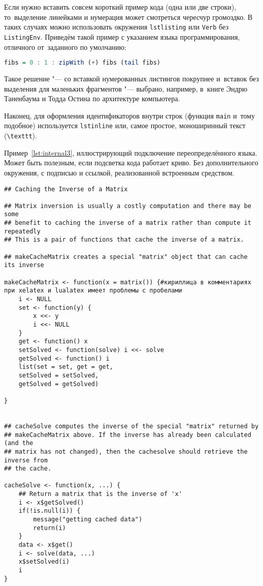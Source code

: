 Если нужно вставить совсем короткий пример кода (одна или две строки),
то~выделение  линейками и нумерация может смотреться чересчур громоздко.
В таких случаях можно использовать окружения \texttt{lstlisting} или
\texttt{Verb} без \texttt{ListingEnv}. Приведём такой пример
с указанием языка программирования, отличного от~заданного по умолчанию:
\begin{lstlisting}[language=Haskell]
fibs = 0 : 1 : zipWith (+) fibs (tail fibs)
\end{lstlisting}
Такое решение "--- со вставкой нумерованных листингов покрупнее
и~вставок без выделения для маленьких фрагментов "--- выбрано,
например, в~книге Эндрю Таненбаума и Тодда Остина по архитектуре
компьютера.

Наконец, для оформления идентификаторов внутри строк
(функция \lstinline{main} и~тому подобное) используется
\texttt{lstinline} или, самое простое, моноширинный текст
(\texttt{\textbackslash texttt}).

Пример~\cref{lst:internal3}, иллюстрирующий подключение переопределённого
языка. Может быть полезным, если подсветка кода работает криво. Без
дополнительного окружения, с подписью и ссылкой, реализованной встроенным
средством.
\begingroup
\captiondelim{ } %
\begin{lstlisting}[language={Renhanced},caption={Пример листинга c подписью собственными средствами},label={lst:internal3}]
## Caching the Inverse of a Matrix

## Matrix inversion is usually a costly computation and there may be some
## benefit to caching the inverse of a matrix rather than compute it repeatedly
## This is a pair of functions that cache the inverse of a matrix.

## makeCacheMatrix creates a special "matrix" object that can cache its inverse

makeCacheMatrix <- function(x = matrix()) {#кириллица в комментариях при xelatex и lualatex имеет проблемы с пробелами
    i <- NULL
    set <- function(y) {
        x <<- y
        i <<- NULL
    }
    get <- function() x
    setSolved <- function(solve) i <<- solve
    getSolved <- function() i
    list(set = set, get = get,
    setSolved = setSolved,
    getSolved = getSolved)

}


## cacheSolve computes the inverse of the special "matrix" returned by
## makeCacheMatrix above. If the inverse has already been calculated (and the
## matrix has not changed), then the cachesolve should retrieve the inverse from
## the cache.

cacheSolve <- function(x, ...) {
    ## Return a matrix that is the inverse of 'x'
    i <- x$getSolved()
    if(!is.null(i)) {
        message("getting cached data")
        return(i)
    }
    data <- x$get()
    i <- solve(data, ...)
    x$setSolved(i)
    i
}
\end{lstlisting} %
\endgroup

